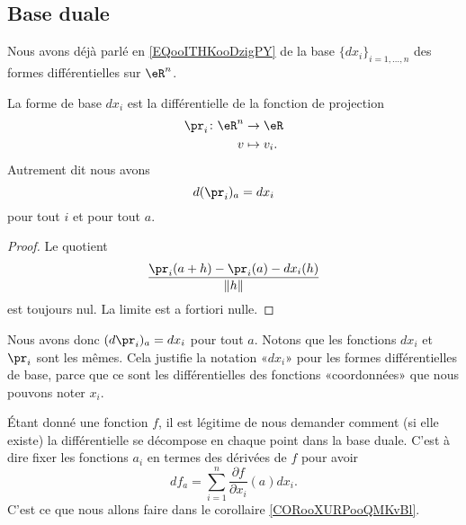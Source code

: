 \subsection{Base duale}

Nous avons déjà parlé en \eqref{EQooITHKooDzigPY} de la base \( \{ dx_i \}_{i=1,\ldots, n}\) des formes différentielles sur \( \eR^n\).

\begin{proposition}
    La forme de base \( dx_i\) est la différentielle de la fonction de projection 
    \begin{equation}
        \begin{aligned}
            \pr_i\colon \eR^n&\to \eR \\
            v&\mapsto v_i. 
        \end{aligned}
    \end{equation}
    Autrement dit nous avons
    \begin{equation}
        d(\pr_i)_a=dx_i
    \end{equation}
    pour tout \( i\) et pour tout \( a\).
\end{proposition}

\begin{proof}
    Le quotient
    \begin{equation}
        \frac{ \pr_i(a+h)-\pr_i(a)-dx_i(h) }{ \| h \| }
    \end{equation}
    est toujours nul. La limite est a fortiori nulle.
\end{proof}

Nous avons donc \( (d\pr_i)_a=dx_i\) pour tout \( a\). Notons que les fonctions \( dx_i\) et \( \pr_i\) sont les mêmes. Cela justifie la notation «\( dx_i\)» pour les formes différentielles de base, parce que ce sont les différentielles des fonctions «coordonnées» que nous pouvons noter \( x_i\).

Étant donné une fonction \( f\), il est légitime de nous demander comment (si elle existe) la différentielle se décompose en chaque point dans la base duale. C'est à dire fixer les fonctions \( a_i\) en termes des dérivées de \( f\) pour avoir
\begin{equation}
    df_a=\sum_{i=1}^n\frac{ \partial f }{ \partial x_i }(a)dx_i.
\end{equation}
C'est ce que nous allons faire dans le corollaire \ref{CORooXURPooQMKvBl}.

